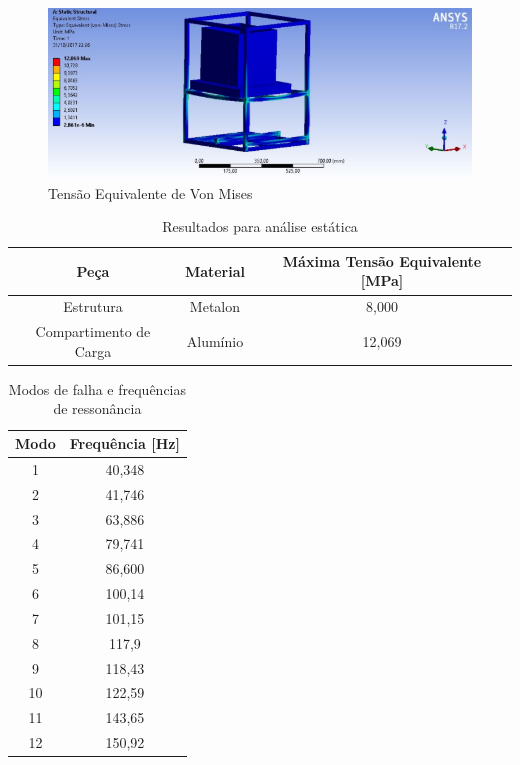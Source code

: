 \begin{figure}[H]
\centering
\includegraphics[width=16cm]{figuras/tensaoequivalente.png}
\caption{Tensão Equivalente de Von Mises}
\end{figure}

\begin{table}[H]
\centering
\caption{Resultados para análise estática}
\label{analiseestatica}
\begin{tabular}{|c|c|c|}
\hline
Peça                   & Material & Máxima Tensão Equivalente {[}MPa{]} \\ \hline
Estrutura              & Metalon  & 8,000                               \\ \hline
Compartimento de Carga & Alumínio & 12,069                              \\ \hline
\end{tabular}
\end{table}

\begin{table}[H]
\centering
\caption{Modos de falha e frequências de ressonância}
\label{ressonancia}
\begin{tabular}{|c|c|}
\hline
Modo & Frequência {[}Hz{]} \\ \hline
1    & 40,348              \\ \hline
2    & 41,746              \\ \hline
3    & 63,886              \\ \hline
4    & 79,741              \\ \hline
5    & 86,600              \\ \hline
6    & 100,14              \\ \hline
7    & 101,15              \\ \hline
8    & 117,9               \\ \hline
9    & 118,43              \\ \hline
10   & 122,59              \\ \hline
11   & 143,65              \\ \hline
12   & 150,92              \\ \hline
\end{tabular}
\end{table}

